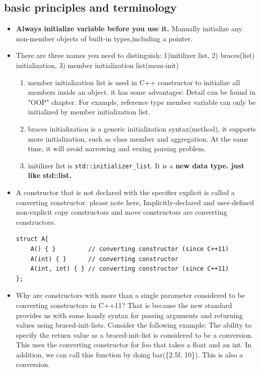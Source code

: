 \documentclass[a4paper,11pt,twoside]{book}
\begin{document}
\subsection{basic principles and terminology}
\begin{itemize}
	\item \textbf{Always initialize variable before you use it.} Manually initialize any non-member objects of built-in types,including a pointer.
	
	\item There are three names you need to distinguish: 1)initilizer list, 2) braces(list) initialization, 3) member initialization list(mem-init)

	\begin{enumerate}
		\item member initialization list is used in C++ constructor to initialize all members inside an object. it has some advantages: Detail can be found in "OOP" chapter. For example, reference type member variable can only be initialized by member initialization list.
		
		\item braces initialization is a generic initialization syntax(method), it supports more initialization, such as class member and aggregation. At the same time, it will avoid narrowing and vexing parsing problem. 
		
		\item initilizer list is \texttt{std::initializer\_list}. It is a \textbf{new data type. just like std::list.}
	\end{enumerate}

	\item A constructor that is not declared with the specifier explicit is called a converting constructor. please note here, Implicitly-declared and user-defined non-explicit copy constructors and move constructors are converting constructors.

\begin{lstlisting}[numbers=none]
struct A{
	A() { }         // converting constructor (since C++11)  
	A(int) { }      // converting constructor
	A(int, int) { } // converting constructor (since C++11)
};
\end{lstlisting}	

	\item Why are constructors with more than a single parameter considered to be converting constructors in C++11? That is because the new standard provides us with some handy syntax for passing arguments and returning values using braced-init-lists. Consider the following example: The ability to specify the return value as a braced-init-list is considered to be a conversion. This uses the converting constructor for foo that takes a float and an int. In addition, we can call this function by doing bar(\{2.5f, 10\}). This is also a conversion. 


\end{itemize}
\end{document}
